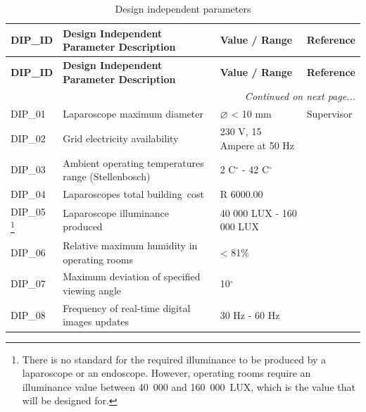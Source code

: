 \begin{longtable}{|p{}|p{}|p{}|p{}|}

\caption{Design independent parameters}        
\label{tab:DIP} \\                             

\hline
\textbf{DIP\_ID} & 
\textbf{Design Independent Parameter Description} & 
\textbf{Value / Range} & 
\textbf{Reference} \\
\hline
\endfirsthead

\hline
\textbf{DIP\_ID} & 
\textbf{Design Independent Parameter Description} & 
\textbf{Value / Range} & 
\textbf{Reference} \\
\hline
\endhead

\hline
\multicolumn{4}{r|}{\textit{Continued on next page...}} \\
\hline
\endfoot

\endlastfoot

DIP\_01 & 
Laparoscope maximum \mbox{diameter} & 
$\varnothing$ < 10 mm & 
Supervisor \\
\hline

DIP\_02 & 
Grid electricity availability & 
230 V, 15 Ampere at 50 Hz & 
\citet{WS} \\
\hline

DIP\_03 & 
Ambient operating temperatures range (Stellenbosch) & 
2 C$^{\circ}$ - 42 C$^{\circ}$ & 
\citet{WC} \\
\hline

DIP\_04 & 
Laparoscopes total \mbox{building cost} & 
R 6000.00 & 
\citet{STEM} \\
\hline

DIP\_05 \footnote{There is no standard for the required illuminance to be produced by a laparoscope or an endoscope. However, operating rooms require an illuminance value between 40~000 and 160~000~LUX, which is the value that will be designed for.} & 
Laparoscope illuminance produced & 
40 000 LUX - 160 000 LUX & 
\citet{IEC} \\
\hline

DIP\_06 & 
Relative maximum humidity in operating rooms & 
< 81\% & 
\citet{WC} \\
\hline

DIP\_07 & 
Maximum deviation of specified viewing angle & 
10$^{\circ}$ & 
\citet{ISO} \\
\hline

DIP\_08 & 
Frequency of real-time \mbox{digital} images updates & 
30 Hz - 60 Hz & 
\citet{KSE-TR} \\
\hline

\end{longtable}

